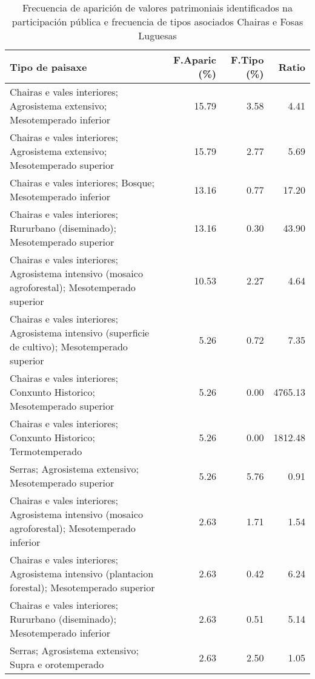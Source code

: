 \begin{table}[p]
\centering
\caption{Frecuencia de aparición de valores patrimoniais identificados na participación pública e frecuencia de tipos asociados Chairas e Fosas Luguesas} 
\label{vsixotpat6}
\begin{tabular}{lrrr}
  \hline
Tipo de paisaxe & F.Aparic (\%) & F.Tipo (\%) & Ratio \\ 
  \hline
Chairas e vales interiores; Agrosistema extensivo; Mesotemperado inferior & 15.79 & 3.58 & 4.41 \\ 
  Chairas e vales interiores; Agrosistema extensivo; Mesotemperado superior & 15.79 & 2.77 & 5.69 \\ 
  Chairas e vales interiores; Bosque; Mesotemperado inferior & 13.16 & 0.77 & 17.20 \\ 
  Chairas e vales interiores; Rururbano (diseminado); Mesotemperado superior & 13.16 & 0.30 & 43.90 \\ 
  Chairas e vales interiores; Agrosistema intensivo (mosaico agroforestal); Mesotemperado superior & 10.53 & 2.27 & 4.64 \\ 
  Chairas e vales interiores; Agrosistema intensivo (superficie de cultivo); Mesotemperado superior & 5.26 & 0.72 & 7.35 \\ 
  Chairas e vales interiores; Conxunto Historico; Mesotemperado superior & 5.26 & 0.00 & 4765.13 \\ 
  Chairas e vales interiores; Conxunto Historico; Termotemperado & 5.26 & 0.00 & 1812.48 \\ 
  Serras; Agrosistema extensivo; Mesotemperado superior & 5.26 & 5.76 & 0.91 \\ 
  Chairas e vales interiores; Agrosistema intensivo (mosaico agroforestal); Mesotemperado inferior & 2.63 & 1.71 & 1.54 \\ 
  Chairas e vales interiores; Agrosistema intensivo (plantacion forestal); Mesotemperado superior & 2.63 & 0.42 & 6.24 \\ 
  Chairas e vales interiores; Rururbano (diseminado); Mesotemperado inferior & 2.63 & 0.51 & 5.14 \\ 
  Serras; Agrosistema extensivo; Supra e orotemperado & 2.63 & 2.50 & 1.05 \\ 
   \hline
\end{tabular}
\end{table}
